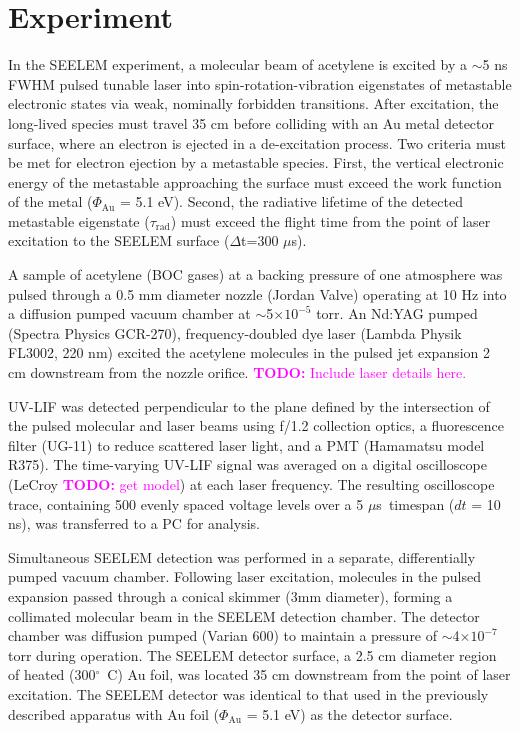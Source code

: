 \documentclass[12pt]{mitthesis}
\newcommand{\TODO} [1]{\textcolor{magenta}{\textbf{TODO:} #1}}
\newcommand{\microsec}{$\mu$s}
\newcommand{\e}[1]{\ensuremath{\times 10^{#1}}}
\newcommand{\degrees}{\ensuremath{^\circ}}
\begin{document}
\section{Experiment}

In the SEELEM experiment, a molecular beam of acetylene is excited by
a $\sim$5 ns FWHM pulsed tunable laser into spin-rotation-vibration
eigenstates of metastable electronic states via weak, nominally
forbidden transitions. After excitation, the long-lived species must
travel 35 cm before colliding with an Au metal detector surface, where
an electron is ejected in a de-excitation process. Two criteria must
be met for electron ejection by a metastable species. First, the
vertical electronic energy of the metastable approaching the surface
must exceed the work function of the metal ($\Phi_{\text{Au}}$ = 5.1
eV). Second, the radiative lifetime of the detected metastable
eigenstate ($\tau_\text{rad}$) must exceed the flight time from the
point of laser excitation to the SEELEM surface ($\Delta$t=300
$\mu$s).

A sample of acetylene (BOC gases) at a backing pressure of one
atmosphere was pulsed through a 0.5 mm diameter nozzle (Jordan Valve)
operating at 10 Hz into a diffusion pumped vacuum chamber at
$\sim$5\e{-5} torr.  An Nd:YAG pumped (Spectra Physics GCR-270),
frequency-doubled dye laser (Lambda Physik FL3002, 220 nm) excited the
acetylene molecules in the pulsed jet expansion 2 cm downstream from
the nozzle orifice.  \TODO{Include laser details here.}

UV-LIF was detected perpendicular to the plane defined by the
intersection of the pulsed molecular and laser beams using f/1.2
collection optics, a fluorescence filter (UG-11) to reduce scattered
laser light, and a PMT (Hamamatsu model R375).  The time-varying
UV-LIF signal was averaged on a digital oscilloscope (LeCroy \TODO{get
  model}) at each laser frequency.  The resulting oscilloscope trace,
containing 500 evenly spaced voltage levels over a 5 \microsec\
timespan ($dt$ = 10 ns), was transferred to a PC for analysis.

Simultaneous SEELEM detection was performed in a separate,
differentially pumped vacuum chamber.  Following laser excitation,
molecules in the pulsed expansion passed through a conical skimmer
(3mm diameter), forming a collimated molecular beam in the SEELEM
detection chamber.  The detector chamber was diffusion pumped (Varian
600) to maintain a pressure of $\sim$4\e{-7} torr during operation.
The SEELEM detector surface, a 2.5 cm diameter region of heated
(300\degrees\ C) Au foil, was located 35 cm downstream from the point
of laser excitation.  The SEELEM detector was identical to that used
in the previously described apparatus with Au foil ($\Phi_{\text{Au}}$
= 5.1 eV) as the detector surface.
\end{document}
